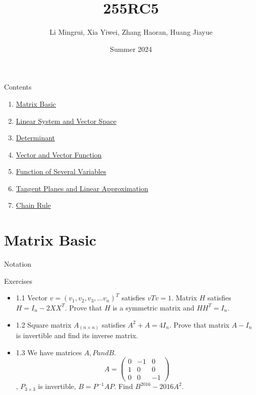 \documentclass{beamer}
\title{\LARGE 255RC5}
\author{ Li Mingrui, Xia Yiwei, Zhang Haoran, Huang Jiayue}
\date{Summer 2024}
\begin{document}
\maketitle



\begin{frame}{Contents}
    \begin{enumerate}
        \item \hyperlink{1}{Matrix Basic}
        \item \hyperlink{2}{Linear System and Vector Space}
        \item \hyperlink{3}{Determinant}
        \item \hyperlink{4}{Vector and Vector Function}
        \item \hyperlink{5}{Function of Several Variables}
        \item \hyperlink{6}{Tangent Planes and Linear Approximation}
        \item \hyperlink{7}{Chain Rule} 
    \end{enumerate}
       
\end{frame}

\section{Matrix Basic} 
\begin{frame}[label=1]{Notation}
  
\end{frame}

\begin{frame}{Exercises}
\begin{itemize}
    \item {1.1} Vector $v=(v_1,v_2,v_3,...v_n)^T$ satisfies $vTv=1$. Matrix $H$ satisfies $H=I_n-2XX^T$. Prove that $H$ is a symmetric matrix and $HH^T=I_n$.
    \item {1.2} Square matrix $A_(n\times n)$ satisfies $A^2+A=4I_n$. Prove that matrix $A-I_n$ is invertible and find its inverse matrix.
    \item {1.3} We have matrices $A,P and B$.
        \begin{equation*}
        A=\begin{pmatrix}
            0&-1&0\\
            1&0&0\\
            0&0&-1
        \end{pmatrix}
        \end{equation*}, $P_{3\times 3}$ is invertible, $B=P^{-1}AP$. Find $B^{2016}-2016A^2$.  
\end{itemize}    
\end{frame}
\end{document}
